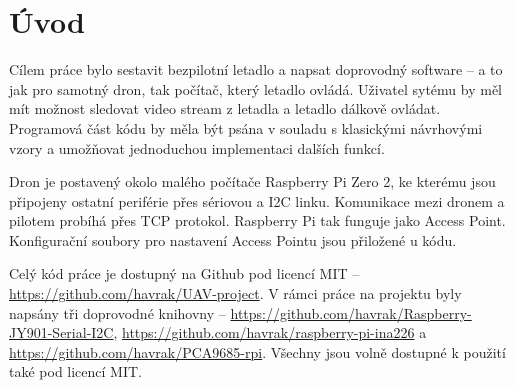 \chapter*{Úvod}

Cílem práce bylo sestavit bezpilotní letadlo a napsat doprovodný software -- a to jak pro samotný dron, tak počítač, který letadlo ovládá.
Uživatel sytému by měl mít možnost sledovat video stream z letadla a letadlo dálkově ovládat.
Programová část kódu by měla být psána v souladu s klasickými návrhovými vzory a umožňovat jednoduchou implementaci dalších funkcí.

Dron je postavený okolo malého počítače Raspberry Pi Zero 2, ke kterému jsou připojeny ostatní periférie přes sériovou a I2C linku.
Komunikace mezi dronem a pilotem probíhá přes TCP protokol.
Raspberry Pi tak funguje jako Access Point.
Konfigurační soubory pro nastavení Access Pointu jsou přiložené u kódu.

Celý kód práce je dostupný na Github pod licencí MIT -- \url{https://github.com/havrak/UAV-project}.
V rámci práce na projektu byly napsány tři doprovodné knihovny -- \url{https://github.com/havrak/Raspberry-JY901-Serial-I2C}, \url{https://github.com/havrak/raspberry-pi-ina226} a \url{https://github.com/havrak/PCA9685-rpi}.
Všechny jsou volně dostupné k použití také pod licencí MIT.

